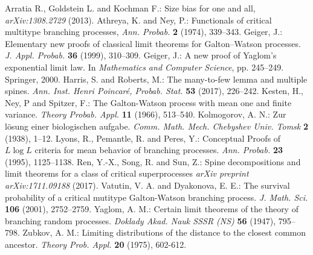 \documentclass[12pt,a4paper]{amsart}
\numberwithin{equation}{section}
\begin{document}
\vspace{.1in}
\begin{thebibliography}{99}
	Arratia R., Goldstein L. and Kochman F.:
	Size bias for one and all,
   {\it arXiv:1308.2729}
	(2013).
	Athreya, K.  and  Ney, P.:
	Functionals of critical multitype branching processes,
	{\it Ann. Probab.}
	{\bf 2} (1974), 339--343.
	Geiger, J.:
	Elementary new proofs of classical limit theorems for Galton--Watson processes.
	{\it J. Appl. Probab.}
	\textbf{36} (1999), 310--309.
	Geiger, J.:
	A new proof of Yaglom's exponential limit law.
	In {\it Mathematics and Computer Science},
	pp. 245--249. Springer, 2000.
	Harris, S. and Roberts, M.:
	The many-to-few lemma and multiple spines.
	{\it Ann.  Inst. Henri Poincar{\'e}, Probab. Stat.}
	\textbf{53} (2017), 226--242.
	Kesten, H.,  Ney, P and Spitzer, F.:
	The Galton-Watson process with mean one and finite variance.
	{\it Theory Probab. Appl.}
	\textbf{11} (1966), 513--540.
	Kolmogorov, A. N.:
	Zur l{\"o}sung einer biologischen aufgabe.
	{\it Comm. Math. Mech. Chebyshev Univ. Tomsk}
	\textbf{2} (1938), 1--12.
	Lyons, R.,  Pemantle, R. and Peres, Y.:
	Conceptual Proofs of $ L \log L $ criteria for mean behavior of branching processes.
	{\it Ann. Probab.} \textbf{23} (1995), 1125--1138.
	Ren, Y.-X., Song, R. and Sun, Z.:
	Spine decompositions and limit theorems for a class of critical superprocesses
	{\it arXiv preprint arXiv:1711.09188}
	(2017).
	Vatutin, V. A. and Dyakonova,  E. E.:
	The survival probability of a critical mutitype Galton-Watson branching process.
	{\it J.  Math. Sci.}
	\textbf{106} (2001), 2752--2759.
	Yaglom, A. M.:
	Certain limit theorems of the theory of branching random processes.
	{\it Doklady Akad. Nauk SSSR (NS)}
	\textbf{56} (1947), 795--798.
	Zubkov, A. M.:
	Limiting distributions of the distance to the closest common ancestor.
	{\it Theory Prob. Appl.}
	\textbf{20} (1975), 602-612.

\end{thebibliography}
\end{document}
